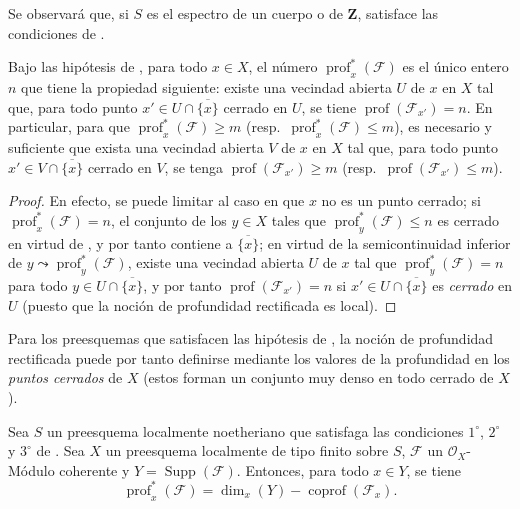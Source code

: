 Se observará que, si $S$ es el espectro de un cuerpo o de $\mathbf Z$, satisface las condiciones de .

\begin{corollary}[10.8.6]
\label{IV.10.8.6}
Bajo las hipótesis de , para todo $x\in X$, el número $\operatorname{prof}^{*}_{x}(\mathcal F)$ es el único entero $n$ que tiene la propiedad siguiente: existe una vecindad abierta $U$ de $x$ en $X$ tal que, para todo punto $x'\in U\cap\overline{\{x\}}$ cerrado \textup{en} $U$, se tiene $\operatorname{prof}(\mathcal F_{x'})=n$.
En particular, para que $\operatorname{prof}^{*}_{x}(\mathcal F)\geq m$ \textup{(resp.\ $\operatorname{prof}^{*}_{x}(\mathcal F)\leq m$)}, es necesario y suficiente que exista una vecindad abierta $V$ de $x$ en $X$ tal que, para todo punto $x'\in V\cap\overline{\{x\}}$ cerrado \textup{en} $V$, se tenga $\operatorname{prof}(\mathcal F_{x'})\geq m$ \textup{(resp.\ $\operatorname{prof}(\mathcal F_{x'})\leq m$)}.
\end{corollary}

\begin{proof}
En efecto, se puede limitar al caso en que $x$ no es un punto cerrado; si $\operatorname{prof}^{*}_{x}(\mathcal F)=n$, el conjunto de los $y\in X$ tales que $\operatorname{prof}^{*}_{y}(\mathcal F)\leq n$ es cerrado en virtud de , y por tanto contiene a $\overline{\{x\}}$; en virtud de la semicontinuidad inferior de $y\leadsto\operatorname{prof}^{*}_{y}(\mathcal F)$, existe una vecindad abierta $U$ de $x$ tal que $\operatorname{prof}^{*}_{y}(\mathcal F)=n$ para todo $y\in U\cap\overline{\{x\}}$, y por tanto $\operatorname{prof}(\mathcal F_{x'})=n$ si $x'\in U\cap\overline{\{x\}}$ es \emph{cerrado} en $U$ (puesto que la noción de profundidad rectificada es local).
\end{proof}

Para los preesquemas que satisfacen las hipótesis de , la noción de profundidad rectificada puede por tanto definirse mediante los valores de la profundidad en los \emph{puntos cerrados} de $X$ (estos forman un conjunto muy denso en todo cerrado de $X$).

\begin{proposition}[10.8.7]
\label{IV.10.8.7}
Sea $S$ un preesquema localmente noetheriano que satisfaga las condiciones $1^\circ$, $2^\circ$ y $3^\circ$ de .
Sea $X$ un preesquema localmente de tipo finito sobre $S$, $\mathcal F$ un $\mathcal O_X$-Módulo coherente y $Y=\operatorname{Supp}(\mathcal F)$.
Entonces, para todo $x\in Y$, se tiene
\begin{equation}
\label{IV.10.8.7.1-fr}
\tag{10.8.7.1}
\operatorname{prof}^{*}_{x}(\mathcal F)
=\dim_x(Y)-\operatorname{coprof}(\mathcal F_x).
\end{equation}
\end{proposition}

